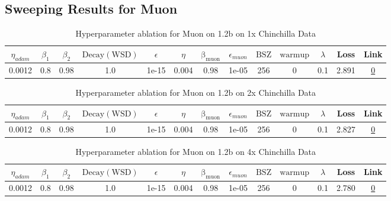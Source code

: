 \subsection{Sweeping Results for Muon}%
\begin{table}[H]
\centering
\caption{Hyperparameter ablation for Muon on 1.2b on 1x Chinchilla Data}
\label{tab:ablation_muon_1.2b_1}
\begin{tabular}{ccccccccccccc}
\toprule
$\eta_{adam}$ & $\beta_1$ & $\beta_2$ & $\mathrm{Decay (WSD)}$ & $\epsilon$ & $\eta$ & $\mathrm{\beta_{muon}}$ & $\epsilon_{muon}$ & $\mathrm{BSZ}$ & $\mathrm{warmup}$ & $\lambda$ & Loss & Link \\
\midrule
0.0012 & 0.8 & 0.98 & 1.0 & 1e-15 & 0.004 & 0.98 & 1e-05 & 256 & 0 & 0.1 & 2.891 & \href{https://wandb.ai/stanford-mercury/optimizer-scaling/runs/sweep-1.2b-24B-muon42df73lr0.004-wd0.1-minlr0.0-warmup0.0-b10.8--70a4b4}{0} \\
\midrule
\bottomrule
\end{tabular}
\end{table}

\begin{table}[H]
\centering
\caption{Hyperparameter ablation for Muon on 1.2b on 2x Chinchilla Data}
\label{tab:ablation_muon_1.2b_2}
\begin{tabular}{ccccccccccccc}
\toprule
$\eta_{adam}$ & $\beta_1$ & $\beta_2$ & $\mathrm{Decay (WSD)}$ & $\epsilon$ & $\eta$ & $\mathrm{\beta_{muon}}$ & $\epsilon_{muon}$ & $\mathrm{BSZ}$ & $\mathrm{warmup}$ & $\lambda$ & Loss & Link \\
\midrule
0.0012 & 0.8 & 0.98 & 1.0 & 1e-15 & 0.004 & 0.98 & 1e-05 & 256 & 0 & 0.1 & 2.827 & \href{https://wandb.ai/stanford-mercury/optimizer-scaling/runs/sweep-1.2b-48B-muon09cdeclr0.004-wd0.1-minlr0.0-warmup0.0-b10.8--4f2850}{0} \\
\midrule
\bottomrule
\end{tabular}
\end{table}

\begin{table}[H]
\centering
\caption{Hyperparameter ablation for Muon on 1.2b on 4x Chinchilla Data}
\label{tab:ablation_muon_1.2b_4}
\begin{tabular}{ccccccccccccc}
\toprule
$\eta_{adam}$ & $\beta_1$ & $\beta_2$ & $\mathrm{Decay (WSD)}$ & $\epsilon$ & $\eta$ & $\mathrm{\beta_{muon}}$ & $\epsilon_{muon}$ & $\mathrm{BSZ}$ & $\mathrm{warmup}$ & $\lambda$ & Loss & Link \\
\midrule
0.0012 & 0.8 & 0.98 & 1.0 & 1e-15 & 0.004 & 0.98 & 1e-05 & 256 & 0 & 0.1 & 2.780 & \href{https://wandb.ai/stanford-mercury/optimizer-scaling/runs/sweep-1.2b-96B-muon5ad2a1lr0.004-wd0.1-minlr0.0-warmup0.0-b10.8--05a146}{0} \\
\midrule
\bottomrule
\end{tabular}
\end{table}

